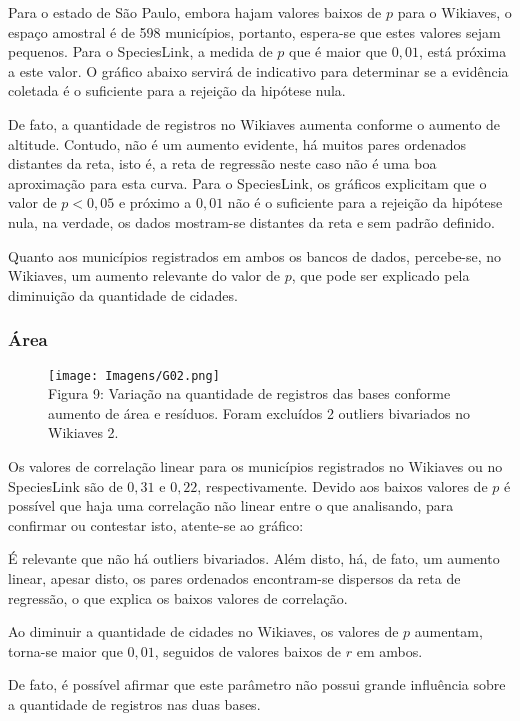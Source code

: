 \documentclass[12pt]{extarticle}
\newenvironment{resposta}{ \color{mygray}}{}
\begin{document}
\begin{resposta}
Para o estado de São Paulo, embora hajam valores baixos de $p$ para o Wikiaves, o espaço amostral é de 598 municípios, portanto, espera-se que estes valores sejam pequenos. Para o SpeciesLink, a medida de $p$ que é maior que $0,01$, está próxima a este valor. O gráfico abaixo servirá de indicativo para determinar se a evidência coletada é o suficiente para a rejeição da hipótese nula.

De fato, a quantidade de registros no Wikiaves aumenta conforme o aumento de altitude. Contudo, não é um aumento evidente, há muitos pares ordenados distantes da reta, isto é, a reta de regressão neste caso não é uma boa aproximação para esta curva. Para o SpeciesLink, os gráficos explicitam que o valor de $p < 0,05$ e próximo a $0,01$ não é o suficiente para a rejeição da hipótese nula, na verdade, os dados mostram-se distantes da reta e sem padrão definido.

Quanto aos municípios registrados em ambos os bancos de dados, percebe-se, no Wikiaves, um aumento relevante do valor de $p$, que pode ser explicado pela diminuição da quantidade de cidades. 
\end{resposta}



\subsubsection{Área}


\begin{figure}[h!]
\centering
\texttt{[image: Imagens/G02.png]}
\\{\scriptsize Figura 9: Variação na quantidade de registros das bases conforme aumento de área e resíduos. Foram excluídos  2 outliers bivariados no Wikiaves 2.}
\end{figure}

\begin{resposta}
 Os valores de correlação linear para os municípios registrados no Wikiaves ou no SpeciesLink são de $0,31$ e $0,22$, respectivamente. Devido aos baixos valores de $p$ é possível que haja uma correlação não linear entre o que analisando, para confirmar ou contestar isto, atente-se ao gráfico: 
 
 É relevante que não há outliers bivariados. Além disto, há, de fato, um aumento linear, apesar disto, os pares ordenados encontram-se dispersos da reta de regressão, o que explica os baixos valores de correlação.

Ao diminuir a quantidade de cidades no Wikiaves, os valores de $p$ aumentam, torna-se maior que $0,01$, seguidos de valores baixos de $r$ em ambos. 

De fato, é possível afirmar que este parâmetro não possui grande influência sobre a quantidade de registros nas duas bases.
\end{resposta}
\end{document}
